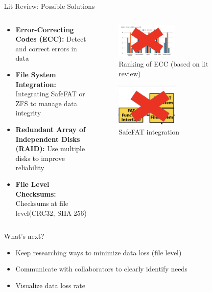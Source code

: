 \begin{frame}{Lit Review: Possible Solutions}
    \begin{columns}
        \begin{column}{0.5\textwidth}
            \begin{itemize}
                \item \textbf{Error-Correcting Codes (ECC):} Detect and correct errors in data
                \item \textbf{File System Integration:} Integrating SafeFAT or ZFS to manage data integrity
                \item \textbf{Redundant Array of Independent Disks (RAID):} Use multiple disks to improve reliability
                \item \textbf{File Level Checksums:} Checksums at file level(CRC32, SHA-256)
            \end{itemize}
        \end{column}
        \begin{column}{0.5\textwidth}
            \begin{figure}
                \centering
                \includegraphics[height=0.4\textheight,width=0.5\textwidth,keepaspectratio]{images/ecc_x.png}
                \caption{Ranking of ECC (based on lit review)}
            \end{figure}
            \begin{figure}
                \centering
                \includegraphics[height=0.4\textheight,width=0.5\textwidth,keepaspectratio]{images/safefat_x.png}
                \caption{SafeFAT integration}
            \end{figure}
        \end{column}
    \end{columns}  
\end{frame}

\begin{frame}{What's next?}
    \begin{itemize}
        \item Keep researching ways to minimize data loss (file level)
        \item Communicate with collaborators to clearly identify needs
        \item Visualize data loss rate
    \end{itemize}
\end{frame}
